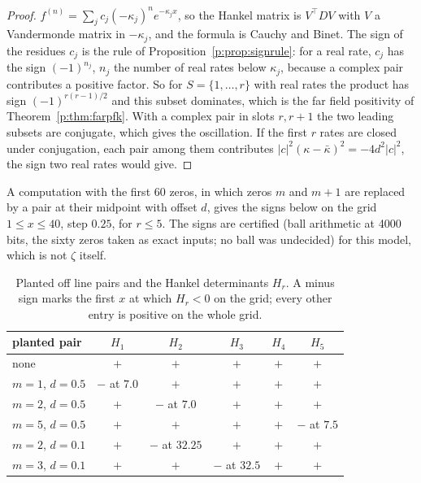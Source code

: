 \begin{proof}
$f^{(n)}=\sum_jc_j(-\kappa_j)^ne^{-\kappa_jx}$, so the Hankel matrix is $V^{\!\top}DV$ with $V$ a Vandermonde matrix in $-\kappa_j$, and the formula is Cauchy and Binet. The sign of the residues $c_j$ is the rule of Proposition~\ref{p:prop:signrule}: for a real rate, $c_j$ has the sign $(-1)^{n_j}$, $n_j$ the number of real rates below $\kappa_j$, because a complex pair contributes a positive factor. So for $S=\{1,\dots,r\}$ with real rates the product has sign $(-1)^{r(r-1)/2}$ and this subset dominates, which is the far field positivity of Theorem~\ref{p:thm:farpfk}. With a complex pair in slots $r,r+1$ the two leading subsets are conjugate, which gives the oscillation. If the first $r$ rates are closed under conjugation, each pair among them contributes $|c|^2(\kappa-\bar\kappa)^2=-4d^2|c|^2$, the sign two real rates would give.
\end{proof}

A computation with the first $60$ zeros, in which zeros $m$ and $m+1$ are replaced by a pair at their midpoint with offset $d$, gives the signs below on the grid $1\le x\le40$, step $0.25$, for $r\le5$. The signs are certified (ball arithmetic at 4000 bits, the sixty zeros taken as exact inputs; no ball was undecided) for this model, which is not $\zeta$ itself.

\begin{table}[ht]
\centering\footnotesize\setlength{\tabcolsep}{4pt}
\begin{tabular}{lccccc}
\toprule
planted pair & $H_1$ & $H_2$ & $H_3$ & $H_4$ & $H_5$\\
\midrule
none & $+$ & $+$ & $+$ & $+$ & $+$\\
$m=1$, $d=0.5$ & $-$ at $7.0$ & $+$ & $+$ & $+$ & $+$\\
$m=2$, $d=0.5$ & $+$ & $-$ at $7.0$ & $+$ & $+$ & $+$\\
$m=5$, $d=0.5$ & $+$ & $+$ & $+$ & $+$ & $-$ at $7.5$\\
$m=2$, $d=0.1$ & $+$ & $-$ at $32.25$ & $+$ & $+$ & $+$\\
$m=3$, $d=0.1$ & $+$ & $+$ & $-$ at $32.5$ & $+$ & $+$\\
\bottomrule
\end{tabular}
\caption{Planted off line pairs and the Hankel determinants $H_r$. A minus sign marks the first $x$ at which $H_r<0$ on the grid; every other entry is positive on the whole grid.}\label{mh:tab:planted}
\end{table}

